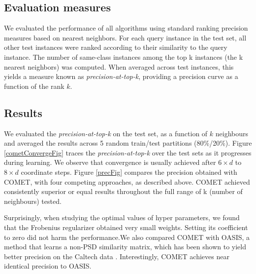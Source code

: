 \documentclass{article}
\begin{document}
\subsection{Evaluation measures}
We evaluated the performance of all algorithms using standard ranking precision measures based on nearest neighbors. For each query instance in the test set, all other test instances were ranked according to their similarity to the query instance. The number of same-class instances
among the top k instances (the k nearest neighbors) was computed. When averaged across test
instances, this yields a measure known as \textit{precision-at-top-k},
providing a precision curve as a function of the rank $k$.




\subsection{Results}
 We evaluated the \textit{precision-at-top-k} on the test set, as a function of $k$ neighbours and averaged the results across 5 random train/test partitions (80\%/20\%).
Figure \ref{cometConvergeFig} traces the \textit{precision-at-top-k} over the test sets as it progresses during learning. We observe that convergence is usually achieved after $6\times d$ to $8 \times d$ coordinate steps.
Figure \ref{precFig} compares the precision obtained with COMET, with four competing approaches, as described above. COMET achieved consistently superior or equal results throughout the full range of k (number of neighbours) tested. 

Surprisingly, when studying the optimal values of hyper parameters, we found that the Frobenius regularizer obtained very small weights. Setting its coefficient to zero did not harm the performance.We also compared COMET with OASIS, a method that learns a non-PSD similarity matrix, which has been shown to yield better precision on the Caltech data \cite{OASIS}. Interestingly, COMET achieves near identical precision to OASIS.
\end{document}
